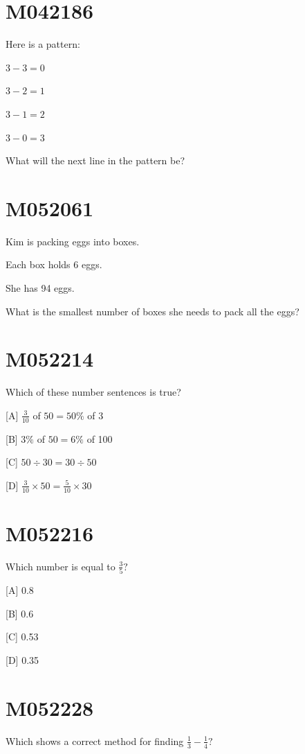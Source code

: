 \documentclass[12pt]{article}
\begin{document}
\newpage
\section*{M042186}

Here is a pattern:

$3-3=0$

$3-2=1$

$3-1=2$

$3-0=3$

What will the next line in the pattern be?



\newpage
\section*{M052061}

Kim is packing eggs into boxes.

Each box holds 6 eggs.

She has 94 eggs.

What is the smallest number of boxes she needs to pack all the eggs?

\newpage
\section*{M052214}

Which of these number sentences is true?

[A] $\frac{3}{10}$ of $50=50 \%$ of 3

[B] $3 \%$ of $50=6 \%$ of 100

[C] $50 \div 30=30 \div 50$

[D] $\frac{3}{10} \times 50=\frac{5}{10} \times 30$

\newpage
\section*{M052216}

Which number is equal to $\frac{3}{5} ?$

[A] 0.8

[B] 0.6

[C] 0.53

[D] 0.35

\newpage
\section*{M052228}

Which shows a correct method for finding $\frac{1}{3}-\frac{1}{4} ?$
\end{document}
